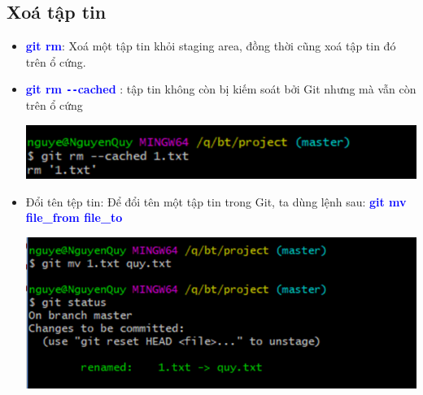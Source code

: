 \documentclass[12pt,a4paper]{report}
\begin{document}
\subsection{Xoá tập tin} 
\begin{itemize}
\item \textcolor{blue}{\bf git rm}: Xoá một tập tin khỏi staging area, đồng thời cũng xoá tập tin đó trên ổ cứng.
\item \textcolor{blue}{\bf git rm \texttt{-{}-}cached} : tập tin không còn bị kiếm soát bởi Git nhưng mà vẫn còn trên ổ cứng


	\includegraphics[width=0.8\linewidth]{screenshot015}
	
	\label{fig:screenshot015}
\item Đổi tên tệp tin: Để đổi tên một tập tin trong Git, ta dùng lệnh sau: \textcolor{blue}{\bf git mv file\_from file\_to}

	\includegraphics[width=0.8\linewidth]{screenshot016}

	\label{fig:screenshot016}
\end{itemize}
	\newpage
\end{document}
